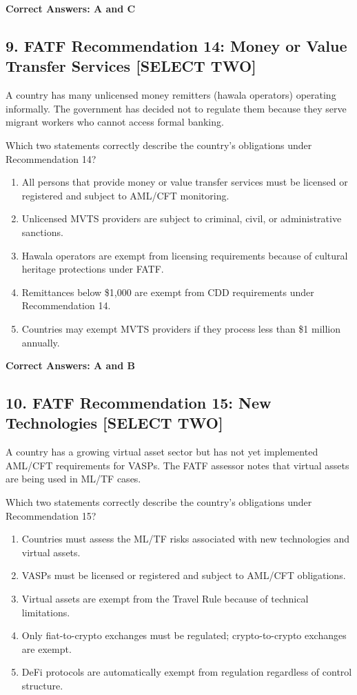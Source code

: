 \documentclass[11pt,a4paper]{article}
\begin{document}
	\textbf{Correct Answers: A and C}
	
	\subsection{9. FATF Recommendation 14: Money or Value Transfer Services \textnormal{[SELECT TWO]}}
	
	A country has many unlicensed money remitters (hawala operators) operating informally. The government has decided not to regulate them because they serve migrant workers who cannot access formal banking.
	
	Which two statements correctly describe the country's obligations under Recommendation 14?
	
	\begin{enumerate}[label=\Alph*.]
		\item All persons that provide money or value transfer services must be licensed or registered and subject to AML/CFT monitoring.
		\item Unlicensed MVTS providers are subject to criminal, civil, or administrative sanctions.
		\item Hawala operators are exempt from licensing requirements because of cultural heritage protections under FATF.
		\item Remittances below \$1,000 are exempt from CDD requirements under Recommendation 14.
		\item Countries may exempt MVTS providers if they process less than \$1 million annually.
	\end{enumerate}
	
	\textbf{Correct Answers: A and B}
	
	\subsection{10. FATF Recommendation 15: New Technologies \textnormal{[SELECT TWO]}}
	
	A country has a growing virtual asset sector but has not yet implemented AML/CFT requirements for VASPs. The FATF assessor notes that virtual assets are being used in ML/TF cases.
	
	Which two statements correctly describe the country's obligations under Recommendation 15?
	
	\begin{enumerate}[label=\Alph*.]
		\item Countries must assess the ML/TF risks associated with new technologies and virtual assets.
		\item VASPs must be licensed or registered and subject to AML/CFT obligations.
		\item Virtual assets are exempt from the Travel Rule because of technical limitations.
		\item Only fiat-to-crypto exchanges must be regulated; crypto-to-crypto exchanges are exempt.
		\item DeFi protocols are automatically exempt from regulation regardless of control structure.
	\end{enumerate}
	
\end{document}
